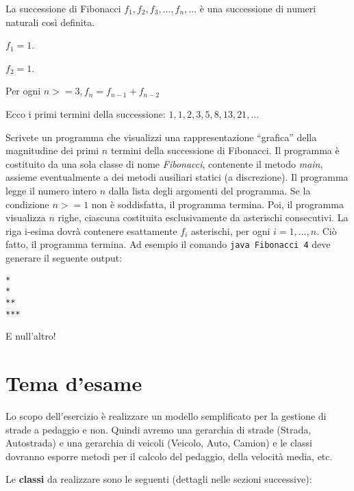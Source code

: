 \documentclass[a4paper,12pt]{article}
\begin{document}
La successione di Fibonacci $f_1, f_2, f_3 , . . . , f_n , . . .$ è una
successione di numeri naturali così definita.
\begin{compactitem}
\item $f_1 = 1$.
\item $f_2 = 1$.
\item Per ogni $n>=3, f_n = f_{n-1} + f_{n-2}$

\end{compactitem}

Ecco i primi termini della successione:
$1, 1, 2, 3, 5, 8, 13, 21, . . .$

Scrivete un programma che visualizzi una rappresentazione ``grafica''
della magnitudine dei primi $n$ termini della successione di Fibonacci.
Il programma è costituito da una sola classe di nome \textit{Fibonacci},
contenente il metodo \textit{main}, assieme eventualmente
a dei metodi ausiliari statici (a discrezione).
Il programma legge il numero intero $n$ dalla lista degli argomenti del programma.
Se la condizione $n>=1$ non è soddisfatta, il programma termina.
Poi, il programma visualizza $n$ righe, ciascuna costituita esclusivamente da asterischi consecutivi. La riga i-esima dovrà contenere esattamente $f_i$ asterischi,
per ogni $i = 1, . . . , n$.
Ciò fatto, il programma termina.
Ad esempio il comando \texttt{java Fibonacci 4} deve generare il seguente output:
\begin{verbatim}
*
*
**
***
\end{verbatim} 
E null'altro!


\newpage



\hrulefill
\section{Tema d'esame}

Lo scopo dell'esercizio è realizzare un modello semplificato per la gestione di 
strade a pedaggio e non. Quindi avremo una gerarchia di strade (Strada, Autostrada)
e una gerarchia di veicoli (Veicolo, Auto, Camion) e le classi dovranno esporre metodi per il calcolo del 
pedaggio, della velocità media, etc.

Le \textbf{classi} da realizzare sono le seguenti (dettagli nelle sezioni successive):
\medskip
\end{document}
